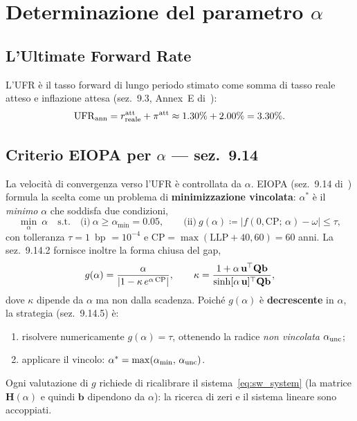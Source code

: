 \documentclass[11pt,a4paper]{article}
\theoremstyle{plain}
\theoremstyle{definition}
\theoremstyle{remark}
\newcommand{\UFR}{\ensuremath{\mathrm{UFR}}}
\newcommand{\LLP}{\ensuremath{\mathrm{LLP}}}
\newcommand{\CP}{\ensuremath{\mathrm{CP}}}
\newcommand{\bfb}{\mathbf{b}}
\newcommand{\bfu}{\mathbf{u}}
\newcommand{\Hmat}{\mathbf{H}}
\newcommand{\Qmat}{\mathbf{Q}}
\newcommand{\transp}{^{\mskip-1mu\top}}
\newcommand{\abs}[1]{\left\lvert #1 \right\rvert}
\newcommand{\defeq}{\coloneqq}
\begin{document}
\section{Determinazione del parametro $\alpha$}
\label{sec:alpha}

\subsection{L'Ultimate Forward Rate}

L'UFR \`e il tasso forward di lungo periodo stimato come somma di
tasso reale atteso e inflazione attesa (sez.~9.3, Annex~E di~\cite{eiopa2025}):
\[
  \UFR_{\rm ann} = r_{\rm reale}^{\rm att} + \pi^{\rm att}
  \approx 1.30\% + 2.00\% = 3.30\%.
\]

\subsection{Criterio EIOPA per $\alpha$ --- sez.~9.14}
\label{sec:criterio_alpha}

La velocit\`a di convergenza verso l'UFR \`e controllata da $\alpha$. EIOPA
(sez.~9.14 di~\cite{eiopa2025}) formula la scelta come un problema di
\textbf{minimizzazione vincolata}: $\alpha^*$ è il \emph{minimo} $\alpha$ che
soddisfa due condizioni,
\begin{equation}
  \label{eq:alpha_crit}
  \min_{\alpha}\ \alpha
  \quad\text{s.t.}\quad
  \text{(i)}\ \alpha \ge \alpha_{\min}=0.05,
  \qquad
  \text{(ii)}\ g(\alpha)\defeq \abs{f(0,\CP;\,\alpha) - \omega} \le \tau,
\end{equation}
con tolleranza $\tau = 1$~bp $=10^{-4}$ e $\CP=\max(\LLP+40,60)=60$ anni.
La sez.~9.14.2 fornisce inoltre la forma chiusa del gap,
\[
  g(\alpha) = \frac{\alpha}{\abs{1-\kappa\,e^{\alpha\,\CP}}},
  \qquad
  \kappa = \frac{1+\alpha\,\bfu\transp\Qmat\bfb}{\sinh[\alpha\,\bfu]\transp\Qmat\bfb},
\]
dove $\kappa$ dipende da $\alpha$ ma non dalla scadenza. Poiché $g(\alpha)$ è
\textbf{decrescente} in $\alpha$, la strategia (sez.~9.14.5) è:
\begin{enumerate}
  \item risolvere numericamente $g(\alpha)=\tau$, ottenendo la radice
        \emph{non vincolata} $\alpha_{\rm unc}$;
  \item applicare il vincolo: $\alpha^* = \max(\alpha_{\min},\,\alpha_{\rm unc})$.
\end{enumerate}
Ogni valutazione di $g$ richiede di ricalibrare il sistema~\eqref{eq:sw_system}
(la matrice $\Hmat(\alpha)$ e quindi $\bfb$ dipendono da $\alpha$): la ricerca
di zeri e il sistema lineare sono accoppiati.
\end{document}
